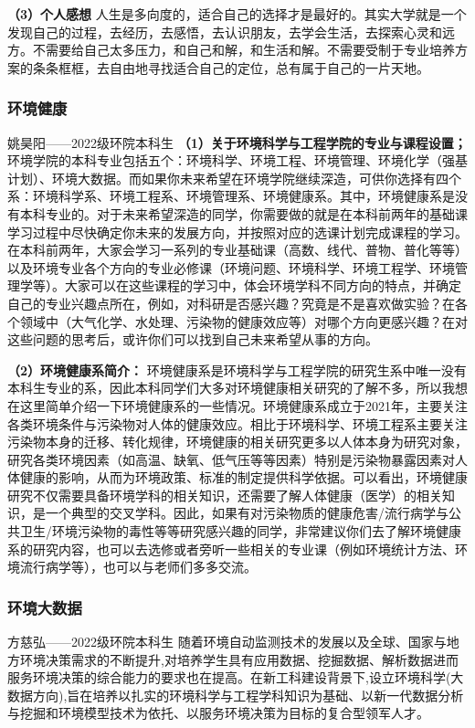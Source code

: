 \documentclass[11pt,oneside]{book}
\begin{document}
\textbf{（3）个人感想}
人生是多向度的，适合自己的选择才是最好的。其实大学就是一个发现自己的过程，去经历，去感悟，去认识朋友，去学会生活，去探索心灵和远方。不需要给自己太多压力，和自己和解，和生活和解。不需要受制于专业培养方案的条条框框，去自由地寻找适合自己的定位，总有属于自己的一片天地。

\subsubsection{环境健康}
姚昊阳——2022级环院本科生
\textbf{（1）关于环境科学与工程学院的专业与课程设置；}
环境学院的本科专业包括五个：环境科学、环境工程、环境管理、环境化学（强基计划）、环境大数据。而如果你未来希望在环境学院继续深造，可供你选择有四个系：环境科学系、环境工程系、环境管理系、环境健康系。其中，环境健康系是没有本科专业的。对于未来希望深造的同学，你需要做的就是在本科前两年的基础课学习过程中尽快确定你未来的发展方向，并按照对应的选课计划完成课程的学习。在本科前两年，大家会学习一系列的专业基础课（高数、线代、普物、普化等等）以及环境专业各个方向的专业必修课（环境问题、环境科学、环境工程学、环境管理学等）。大家可以在这些课程的学习中，体会环境学科不同方向的特点，并确定自己的专业兴趣点所在，例如，对科研是否感兴趣？究竟是不是喜欢做实验？在各个领域中（大气化学、水处理、污染物的健康效应等）对哪个方向更感兴趣？在对这些问题的思考后，或许你们可以找到自己未来希望从事的方向。

\textbf{（2）环境健康系简介：}
环境健康系是环境科学与工程学院的研究生系中唯一没有本科生专业的系，因此本科同学们大多对环境健康相关研究的了解不多，所以我想在这里简单介绍一下环境健康系的一些情况。环境健康系成立于2021年，主要关注各类环境条件与污染物对人体的健康效应。相比于环境科学、环境工程系主要关注污染物本身的迁移、转化规律，环境健康的相关研究更多以人体本身为研究对象，研究各类环境因素（如高温、缺氧、低气压等等因素）特别是污染物暴露因素对人体健康的影响，从而为环境政策、标准的制定提供科学依据。可以看出，环境健康研究不仅需要具备环境学科的相关知识，还需要了解人体健康（医学）的相关知识，是一个典型的交叉学科。因此，如果有对污染物质的健康危害/流行病学与公共卫生/环境污染物的毒性等等研究感兴趣的同学，非常建议你们去了解环境健康系的研究内容，也可以去选修或者旁听一些相关的专业课（例如环境统计方法、环境流行病学等），也可以与老师们多多交流。

\subsubsection{环境大数据}
方慈弘——2022级环院本科生
随着环境自动监测技术的发展以及全球、国家与地方环境决策需求的不断提升,对培养学生具有应用数据、挖掘数据、解析数据进而服务环境决策的综合能力的要求也在提高。在新工科建设背景下,设立环境科学(大数据方向),旨在培养以扎实的环境科学与工程学科知识为基础、以新一代数据分析与挖掘和环境模型技术为依托、以服务环境决策为目标的复合型领军人才。
\end{document}
